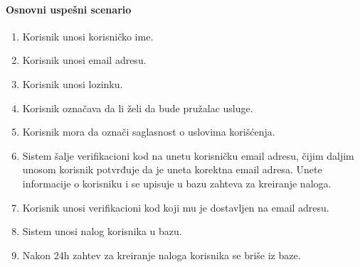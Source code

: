 \documentclass[a4paper,12pt]{report}
\begin{document}
    \paragraph*{Osnovni uspešni scenario}
    \begin{enumerate}
        \item Korisnik unosi korisničko ime.
        \item Korisnik unosi email adresu.
        \item Korisnik unosi lozinku.
        \item Korisnik označava da li želi da bude pružalac usluge.
        \item Korisnik mora da označi saglasnost o uslovima korišćenja.
        \item Sistem šalje verifikacioni kod na unetu korisničku email adresu, čijim daljim unosom korisnik potvrđuje da je uneta korektna email adresa. Unete informacije o korisniku i se upisuje u bazu zahteva za kreiranje naloga. 
        \item Korisnik unosi verifikacioni kod koji mu je dostavljen na email adresu.
        \item Sistem unosi nalog korisnika u bazu.
        \item Nakon 24h zahtev za kreiranje naloga korisnika se briše iz baze.
    \end{enumerate}
\end{document}
